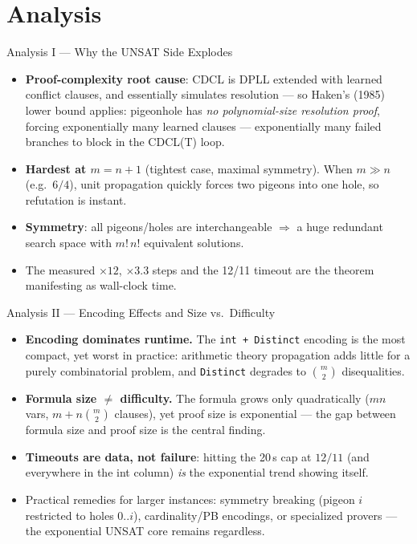 \documentclass[10pt,aspectratio=169,xcolor={table}]{beamer}
\begin{document}
\section{Analysis}

\begin{frame}{Analysis I --- Why the UNSAT Side Explodes}
  \begin{itemize}\itemsep4pt
    \item \textbf{Proof-complexity root cause}: CDCL is DPLL
          extended with learned conflict clauses, and essentially
          simulates resolution --- so Haken's (1985) lower bound
          applies: pigeonhole has \emph{no polynomial-size
          resolution proof}, forcing exponentially many learned
          clauses --- exponentially many failed branches to block
          in the CDCL(T) loop.
    \item \textbf{Hardest at $m=n+1$} (tightest case, maximal
          symmetry). When $m \gg n$ (e.g.\ $6/4$), unit
          propagation quickly forces two pigeons into one hole,
          so refutation is instant.
    \item \textbf{Symmetry}: all pigeons/holes are
          interchangeable $\Rightarrow$ a huge redundant search
          space with $m!\,n!$ equivalent solutions.
    \item The measured $\times 12$, $\times 3.3$ steps and the
          12/11 timeout are the theorem manifesting as wall-clock
          time.
  \end{itemize}
\end{frame}

\begin{frame}{Analysis II --- Encoding Effects and Size vs.\ Difficulty}
  \begin{itemize}\itemsep4pt
    \item \textbf{Encoding dominates runtime.} The \texttt{int +
          Distinct} encoding is the most compact, yet worst in
          practice: arithmetic theory propagation adds little for
          a purely combinatorial problem, and \texttt{Distinct}
          degrades to $\binom{m}{2}$ disequalities.
    \item \textbf{Formula size $\ne$ difficulty.} The formula
          grows only quadratically ($m n$ vars,
          $m + n\binom{m}{2}$ clauses), yet proof size is
          exponential --- the gap between formula size and proof
          size is the central finding.
    \item \textbf{Timeouts are data, not failure}: hitting the
          20\,s cap at $12/11$ (and everywhere in the int column)
          \emph{is} the exponential trend showing itself.
    \item Practical remedies for larger instances: symmetry
          breaking (pigeon $i$ restricted to holes $0..i$),
          cardinality/PB encodings, or specialized provers --- the
          exponential UNSAT core remains regardless.
  \end{itemize}
\end{frame}
\end{document}
